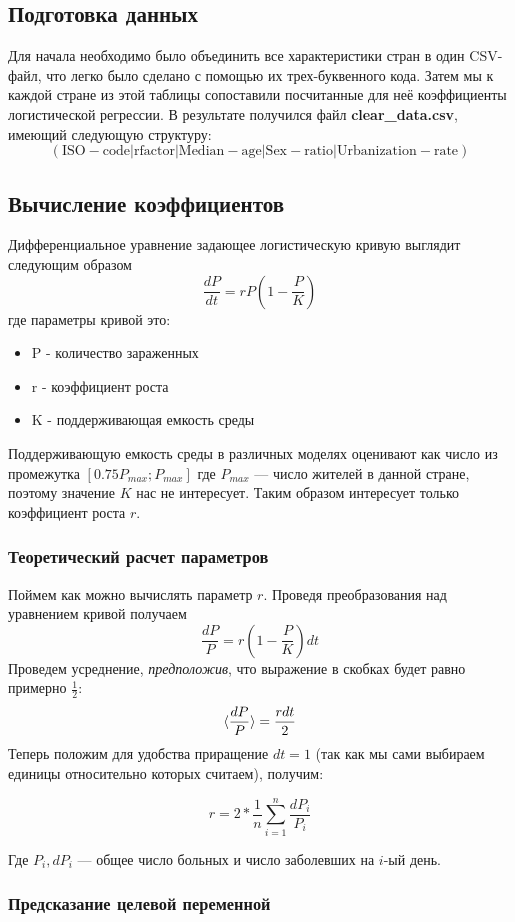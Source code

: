 \documentclass{article}
\begin{document}
\subsection{Подготовка данных}
Для начала необходимо было объединить все характеристики стран в один CSV-файл, что легко было сделано с помощью их трех-буквенного кода. Затем мы к каждой стране из этой таблицы сопоставили посчитанные для неё коэффициенты логистической регрессии. В результате получился файл \textbf{clear\_data.csv}, имеющий следующую структуру:
\[\mathrm{(ISO-code|rfactor|Median-age|Sex-ratio|Urbanization -rate)}\]

\subsection{Вычисление коэффициентов}
Дифференциальное уравнение задающее логистическую кривую выглядит следующим образом
\[\frac{dP}{dt} = rP(1-\frac{P}{K})\]
где параметры кривой это:

\begin{itemize}
    \item P - количество зараженных
    \item r - коэффициент роста
    \item K - поддерживающая емкость среды
\end{itemize} 

Поддерживающую емкость среды в различных моделях оценивают как число из промежутка \([0.75P_{max}; P_{max}]\) где \(P_{max}\) --- число жителей в данной стране, поэтому значение \(K\) нас не интересует. Таким образом интересует только коэффициент роста \(r\).

\subsubsection{Теоретический расчет параметров}
Поймем как можно вычислять параметр \(r\). Проведя преобразования над уравнением кривой получаем
\[\frac{dP}{P} = r\left(1 - \frac{P}{K}\right)dt\]
Проведем усреднение, \textit{предположив}, что выражение в скобках будет равно примерно \(\frac{1}{2}\):
\[\braket{\frac{dP}{P}} = \frac{rdt}{2}\]
Теперь положим для удобства приращение \(dt = 1\) (так как мы сами выбираем единицы относительно которых считаем), получим:

\[r = 2 * \frac{1}{n}\sum_{i=1}^{n} \frac{dP_i}{P_i}\]

Где \(P_i, dP_i\) --- общее число больных и число заболевших на \(i\)-ый день.

\subsubsection{Предсказание целевой переменной}
\end{document}

